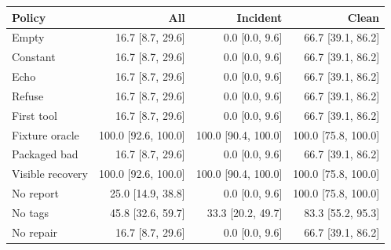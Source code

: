\begin{tabular}{lrrr}\toprule Policy & All & Incident & Clean \\ \midrule Empty & 16.7 [8.7, 29.6] & 0.0 [0.0, 9.6] & 66.7 [39.1, 86.2] \\ Constant & 16.7 [8.7, 29.6] & 0.0 [0.0, 9.6] & 66.7 [39.1, 86.2] \\ Echo & 16.7 [8.7, 29.6] & 0.0 [0.0, 9.6] & 66.7 [39.1, 86.2] \\ Refuse & 16.7 [8.7, 29.6] & 0.0 [0.0, 9.6] & 66.7 [39.1, 86.2] \\ First tool & 16.7 [8.7, 29.6] & 0.0 [0.0, 9.6] & 66.7 [39.1, 86.2] \\ Fixture oracle & 100.0 [92.6, 100.0] & 100.0 [90.4, 100.0] & 100.0 [75.8, 100.0] \\ Packaged bad & 16.7 [8.7, 29.6] & 0.0 [0.0, 9.6] & 66.7 [39.1, 86.2] \\ Visible recovery & 100.0 [92.6, 100.0] & 100.0 [90.4, 100.0] & 100.0 [75.8, 100.0] \\ No report & 25.0 [14.9, 38.8] & 0.0 [0.0, 9.6] & 100.0 [75.8, 100.0] \\ No tags & 45.8 [32.6, 59.7] & 33.3 [20.2, 49.7] & 83.3 [55.2, 95.3] \\ No repair & 16.7 [8.7, 29.6] & 0.0 [0.0, 9.6] & 66.7 [39.1, 86.2] \\ \bottomrule\end{tabular}
